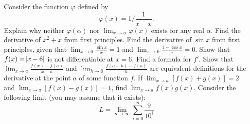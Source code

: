 \begin{questions}
\begin{multicols}{2}
    \end{multicols}
  \questioM Consider the function $ \varphi $ defined by
            \begin{displaymath}
              \varphi(x) = 1/\frac{1}{x - x}.
            \end{displaymath}
            Explain why neither $ \varphi(\alpha) $ nor $ \lim_{x \to \alpha} \varphi(x) $ exists for any real $\alpha $.
  \questioM Find the derivative of $ x^2 + x $ from first principles.
  \questioE Find the derivative of $ \sin x $ from first principles, given that $ \lim_{x \to 0} \frac{\sin x}{x} = 1 $
            and $ \lim_{x \to 0} \frac{1 - \cos x}{x} = 0 $.
  \questioE Show that $ f(x) = \abs{x - 6} $ is not differentiable at $ x = 6 $. Find a formula for $ f' $.
  \questioE Show that $ \lim_{x \to a} \frac{f(x) - f(a)}{x - a} $ and $ \lim_{h \to 0} \frac{f(a + h) - f(a)}{h} $ are
            equivalent definitions for the derivative at the point $ a $ of some function $ f $.
  \questioE If $ \lim_{x \to a} [f(x) + g(x)] = 2 $ and $ \lim_{x \to a} [f(x) - g(x)] = 1 $, find $ \lim_{x \to a} f(x)g(x) $.
  \questioS Consider the following limit (you may assume that it exists):
            \begin{displaymath}
              L = \lim_{n \to \infty} \sum^n_{i = 0} \frac{9}{10^i}
            \end{displaymath}
\end{questions}
